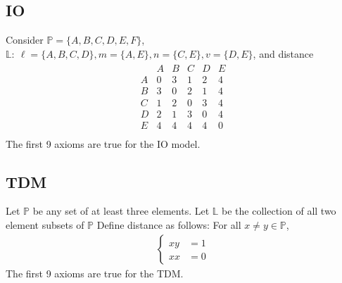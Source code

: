 \documentclass{report}
\begin{document}
    \bigbreak \noindent 
    \subsection{IO}
    \bigbreak \noindent 
    Consider $\mathbb{P} = \{A,B,C,D,E,F\}$, $\mathbb{L}:\ \ell = \{A,B,C,D\}, m = \{A,E\}, n  = \{C,E\} , v = \{D,E\} $, and distance
    \bigbreak \noindent 
    \begin{align*}
        \begin{array}{c|ccccc}
                   &A&B&C&D&E \\ 
            A & 0 & 3 & 1 & 2 & 4\\
            B &  3 & 0 & 2  & 1 & 4\\
            C &  1 & 2 & 0 & 3 & 4\\
            D & 2 &1 & 3 & 0 & 4\\
            E & 4 & 4& 4 & 4 & 0\\
        \end{array}
    \end{align*}
    \bigbreak \noindent 
    The first 9 axioms are true for the IO model.

    \bigbreak \noindent 
    \subsection{TDM}
    \bigbreak \noindent 
    Let $\mathbb{P}$ be any set of at least three elements. Let $\mathbb{L}$ be the collection of all two element subsets of $\mathbb{P} $
    \bigbreak \noindent 
    Define distance as follows: For all $x\ne y \in \mathbb{P}$, 
    \begin{align*}
        \begin{cases}
            xy &= 1 \\
            xx &= 0
        \end{cases}
    \end{align*}
    \bigbreak \noindent 
    The first 9 axioms are true for the TDM.

    \bigbreak \noindent 
\end{document}
